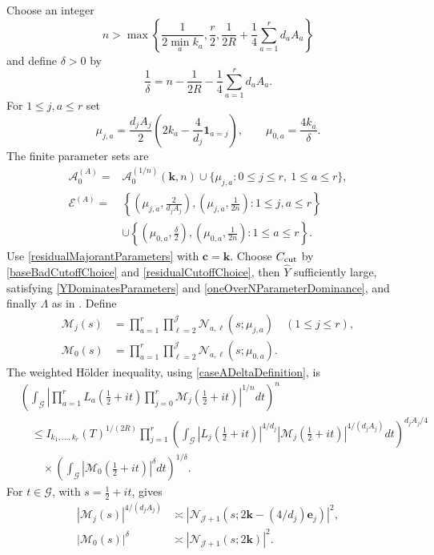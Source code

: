 \documentclass[oneside, 12pt]{amsart}
\theoremstyle{definition}
\begin{document}
{		Choose an integer
		\[
		n>\max\left\{
		\frac1{2\min_ak_a},
		\frac r2,
		\frac1{2R}+\frac14\sum_{a=1}^rd_aA_a
		\right\}
		\]
		and define $\delta>0$ by
		\begin{equation}\label{caseADeltaDefinition}
			\frac1\delta=n-\frac1{2R}-\frac14\sum_{a=1}^rd_aA_a.
		\end{equation}
		For $1\leq j,a\leq r$ set
		\[
		\mu_{j,a}=\frac{d_jA_j}{2}
		\left(2k_a-\frac4{d_j}\mathbf1_{a=j}\right),
		\qquad
		\mu_{0,a}=\frac{4k_a}{\delta}.
		\]
		The finite parameter sets are
		\begin{align*}
			\mathscr A_0^{(A)}={}&
			\mathscr A_0^{(1/n)}(\boldsymbol k,n)
			\cup\{\mu_{j,a}:0\leq j\leq r,\ 1\leq a\leq r\},\\
			\mathscr E^{(A)}={}&
			\left\{\left(\mu_{j,a},\frac{2}{d_jA_j}\right),
			\left(\mu_{j,a},\frac1{2n}\right):1\leq j,a\leq r\right\}\\
			&\cup\left\{\left(\mu_{0,a},\frac\delta2\right),
			\left(\mu_{0,a},\frac1{2n}\right):1\leq a\leq r\right\}.
		\end{align*}
		Use \eqref{residualMajorantParameters} with $\boldsymbol c=\boldsymbol k$.
		Choose $C_{\rm cut}$ by \eqref{baseBadCutoffChoice} and
		\eqref{residualCutoffChoice}, then $\widehat Y$ sufficiently large, satisfying
		\eqref{YDominatesParameters} and \eqref{oneOverNParameterDominance},
		and finally $\Lambda$ as in .
		Define
		\begin{align*}
			\mathcal M_j(s)&=
			\prod_{a=1}^r\prod_{\ell=2}^{\mathscr J}
			\mathcal N_{a,\ell}(s;\mu_{j,a})\quad(1\leq j\leq r),\\
			\mathcal M_0(s)&=
			\prod_{a=1}^r\prod_{\ell=2}^{\mathscr J}
			\mathcal N_{a,\ell}(s;\mu_{0,a}).
		\end{align*}
		The weighted Hölder inequality, using
		\eqref{caseADeltaDefinition}, is
		\begin{align}
			&\left(\int_{\mathscr G}
			\left|\prod_{a=1}^rL_a(\tfrac12+it)
			\prod_{j=0}^r\mathcal M_j(\tfrac12+it)
			\right|^{1/n}dt\right)^n\nonumber\\
			&\quad\leq
			I_{k_1,\ldots,k_r}(T)^{1/(2R)}
			\prod_{j=1}^r\left(
			\int_{\mathscr G}|L_j(\tfrac12+it)|^{4/d_j}
			|\mathcal M_j(\tfrac12+it)|^{4/(d_jA_j)}dt
			\right)^{d_jA_j/4}\nonumber\\
			&\qquad\times
			\left(\int_{\mathscr G}
			|\mathcal M_0(\tfrac12+it)|^\delta dt\right)^{1/\delta}.
			\label{caseAHolder}
		\end{align}
		For $t\in\mathscr G$, with $s=\tfrac12+it$,
		 gives
		\begin{align}
			|\mathcal M_j(s)|^{4/(d_jA_j)}
			&\asymp
			|\mathcal N_{\mathscr J+1}
			(s;2\boldsymbol k-(4/d_j)\boldsymbol e_j)|^2,
			\label{caseATwistedCollapse}\\
			|\mathcal M_0(s)|^\delta
			&\asymp
			|\mathcal N_{\mathscr J+1}(s;2\boldsymbol k)|^2.
			\label{caseAResidualCollapse}
		\end{align}
		
}
\end{document}
